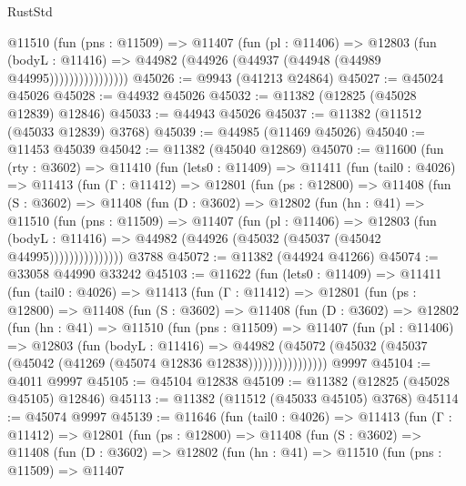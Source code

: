 \begin{lexlean}{RustStd}
\begin{coremodule}
                    @11510
                      (fun (pns : @11509) =>
                      @11407
                        (fun (pl : @11406) =>
                        @12803
                          (fun (bodyL : @11416) =>
                          @44982 (@44926 (@44937 (@44948 (@44989 @44995))))))))))))))))
@45026 := @9943 (@41213 @24864)
@45027 := @45024 @45026
@45028 := @44932 @45026
@45032 := @11382 (@12825 (@45028 @12839) @12846)
@45033 := @44943 @45026
@45037 := @11382 (@11512 (@45033 @12839) @3768)
@45039 := @44985 (@11469 @45026)
@45040 := @11453 @45039
@45042 := @11382 (@45040 @12869)
@45070 := @11600
    (fun (rty : @3602) =>
    @11410
      (fun (lets0 : @11409) =>
      @11411
        (fun (tail0 : @4026) =>
        @11413
          (fun (Γ : @11412) =>
          @12801
            (fun (ps : @12800) =>
            @11408
              (fun (S : @3602) =>
              @11408
                (fun (D : @3602) =>
                @12802
                  (fun (hn : @41) =>
                  @11510
                    (fun (pns : @11509) =>
                    @11407
                      (fun (pl : @11406) =>
                      @12803
                        (fun (bodyL : @11416) =>
                        @44982 (@44926 (@45032 (@45037 (@45042 @44995)))))))))))))))
    @3788
@45072 := @11382 (@44924 @41266)
@45074 := @33058 @44990 @33242
@45103 := @11622
    (fun (lets0 : @11409) =>
    @11411
      (fun (tail0 : @4026) =>
      @11413
        (fun (Γ : @11412) =>
        @12801
          (fun (ps : @12800) =>
          @11408
            (fun (S : @3602) =>
            @11408
              (fun (D : @3602) =>
              @12802
                (fun (hn : @41) =>
                @11510
                  (fun (pns : @11509) =>
                  @11407
                    (fun (pl : @11406) =>
                    @12803
                      (fun (bodyL : @11416) =>
                      @44982
                        (@45072
                          (@45032 (@45037 (@45042 (@41269 (@45074 @12836 @12838))))))))))))))))
    @9997
@45104 := @4011 @9997
@45105 := @45104 @12838
@45109 := @11382 (@12825 (@45028 @45105) @12846)
@45113 := @11382 (@11512 (@45033 @45105) @3768)
@45114 := @45074 @9997
@45139 := @11646
    (fun (tail0 : @4026) =>
    @11413
      (fun (Γ : @11412) =>
      @12801
        (fun (ps : @12800) =>
        @11408
          (fun (S : @3602) =>
          @11408
            (fun (D : @3602) =>
            @12802
              (fun (hn : @41) =>
              @11510
                (fun (pns : @11509) =>
                @11407

\end{coremodule}
\end{lexlean}
